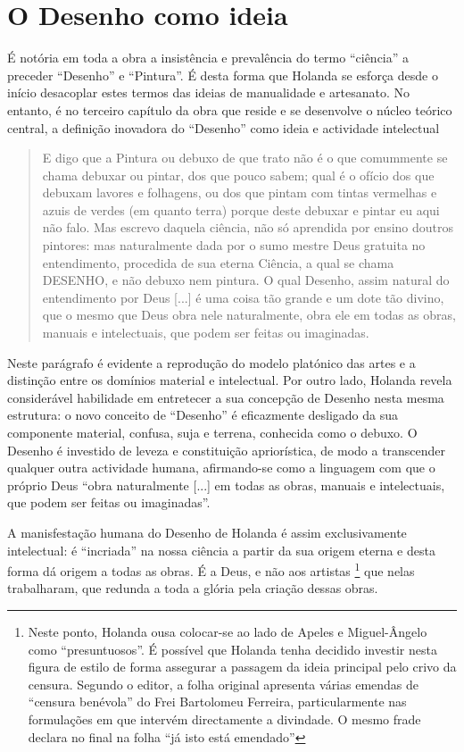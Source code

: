 \documentclass{article}
\begin{document}
\section{O Desenho como ideia}

É notória em toda a obra a insistência e prevalência do termo
``ciência'' a preceder ``Desenho'' e ``Pintura''. É desta forma que
Holanda se esforça desde o início desacoplar estes termos das ideias
de manualidade e artesanato. No entanto, é no terceiro capítulo da
obra que reside e se desenvolve o núcleo teórico central, a definição
inovadora do ``Desenho'' como ideia e actividade intelectual
\cite[fl.36v]{holanda}

\begin{quote}
  E digo que a Pintura ou debuxo de que trato não é o que comummente
  se chama debuxar ou pintar, dos que pouco sabem; qual é o ofício dos
  que debuxam lavores e folhagens, ou dos que pintam com tintas
  vermelhas e azuis de verdes (em quanto terra) porque deste debuxar e
  pintar eu aqui não falo. Mas escrevo daquela ciência, não só
  aprendida por ensino doutros pintores: mas naturalmente dada por o
  sumo mestre Deus gratuita no entendimento, procedida de sua eterna
  Ciência, a qual se chama DESENHO, e não debuxo nem pintura. O qual
  Desenho, assim natural do entendimento por Deus [...] é uma coisa
  tão grande e um dote tão divino, que o mesmo que Deus obra nele
  naturalmente, obra ele em todas as obras, manuais e intelectuais,
  que podem ser feitas ou imaginadas.
\end{quote}

Neste parágrafo é evidente a reprodução do modelo platónico das artes
e a distinção entre os domínios material e intelectual. Por outro
lado, Holanda revela considerável habilidade em entretecer a sua
concepção de Desenho nesta mesma estrutura: o novo conceito de
``Desenho'' é eficazmente desligado da sua componente material,
confusa, suja e terrena, conhecida como o debuxo. O Desenho é
investido de leveza e constituição apriorística, de modo a transcender
qualquer outra actividade humana, afirmando-se como a linguagem com
que o próprio Deus ``obra naturalmente [...] em todas as obras,
manuais e intelectuais, que podem ser feitas ou
imaginadas''.\cite[fl.36v]{holanda}

A manisfestação humana do Desenho de Holanda é assim exclusivamente
intelectual: é ``incriada'' na nossa ciência a partir da sua origem
eterna e desta forma dá origem a todas as obras. É a Deus, e não aos
artistas \footnote{Neste ponto, Holanda ousa colocar-se ao lado de
  Apeles e Miguel-Ângelo como ``presuntuosos''. É possível que Holanda
  tenha decidido investir nesta figura de estilo de forma assegurar a
  passagem da ideia principal pelo crivo da censura. Segundo o editor,
  a folha original apresenta várias emendas de ``censura benévola'' do
  Frei Bartolomeu Ferreira, particularmente nas formulações em que
  intervém directamente a divindade. O mesmo frade declara no final na
  folha ``já isto está emendado''} que nelas trabalharam, que redunda
a toda a glória pela criação dessas obras.
\end{document}
